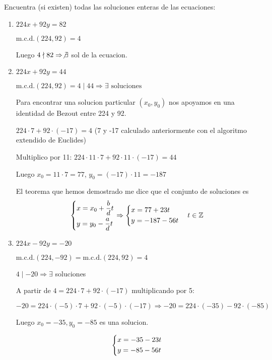 \begin{example}
	Encuentra (si existen) todas las soluciones enteras de las ecuaciones:
	\begin{enumerate}
		\item \(224x + 92y = 82\)
		      
		      \(\mathrm{m.c.d.}(224,92) = 4 \)
		      
		      Luego \(4 \nmid 82 \Rightarrow \not\exists \) sol de la ecuacion.
		      
		\item \(224x + 92y = 44\)
		      
		      \(\mathrm{m.c.d.}(224,92) = 4 \mid 44 \Rightarrow \exists \text{ soluciones}  \)
		      
		      Para encontrar una solucion particular \((x_0,y_0 )\) nos apoyamos en una identidad de Bezout entre 224 y 92.
		      
		      \(224 \cdot 7 + 92 \cdot (-17) = 4 \) (7 y -17 calculado anteriormente con el algoritmo extendido de Euclides)
		      
		      Multiplico por 11: \(224 \cdot 11 \cdot 7 + 92 \cdot 11 \cdot (-17) = 44 \)
		      
		      Luego \(x_0 = 11 \cdot 7 = 77 \), \(y_0 = (-17) \cdot 11 = -187\)
		      
		      El teorema que hemos demostrado me dice que el conjunto de soluciones es
		      \[
			      \begin{dcases}
				      x = x_0 + \frac{b}{d} t \\
				      y = y_0 - \frac{a }{d }t
			      \end{dcases} \Rightarrow
			      \begin{dcases}
				      x = 77 + 23t \\
				      y = -187 - 56t
			      \end{dcases} \quad t \in \mathbb{Z}
		      \]
		\item \(224x - 92y = -20 \)
		      
		      \(\mathrm{m.c.d.}(224,-92) = \mathrm{m.c.d.}(224,92) = 4  \)
		      
		      \(4 \mid -20 \Rightarrow \exists \) soluciones
		      
		      A partir de \(4 = 224 \cdot 7 + 92 \cdot (-17)\) multiplicando por 5:
		      
		      \(-20 = 224 \cdot (-5) \cdot 7 + 92 \cdot (-5) \cdot (-17) \Rightarrow -20 = 224 \cdot (-35) - 92 \cdot (-85)\)
		      
		      Luego \(x_0 = -35, y_0 = -85 \) es una solucion.
		      
		      \[
			      \begin{dcases}
				      x = -35 - 23t \\
				      y = -85 - 56t
			      \end{dcases}
		      \]
	\end{enumerate}
\end{example}

